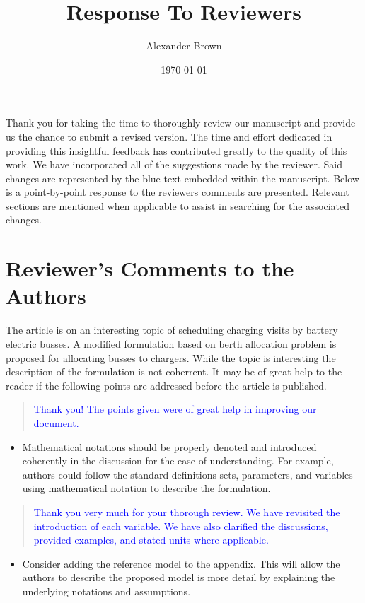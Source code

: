 \documentclass[11pt,a4paper,final]{article}
\author{Alexander Brown}
\date{\today}
\title{Response To Reviewers}
\begin{document}
\maketitle
Thank you for taking the time to thoroughly review our manuscript and provide us the chance to submit a revised version.
The time and effort dedicated in providing this insightful feedback has contributed greatly to the quality of this
work. We have incorporated all of the suggestions made by the reviewer. Said changes are represented by the blue text
embedded within the manuscript. Below is a point-by-point response to the reviewers comments are presented. Relevant
sections are mentioned when applicable to assist in searching for the associated changes.

\section{Reviewer's Comments to the Authors}
\label{sec:org262d0f1}

The article is on an interesting topic of scheduling charging visits by battery electric busses. A modified formulation
based on berth allocation problem is proposed for allocating busses to chargers. While the topic is interesting the
description of the formulation is not coherrent. It may be of great help to the reader if the following points are
addressed before the article is published.

\begin{quote}
  \textcolor{blue}{Thank you! The points given were of great help in improving our document.}
\end{quote}

\begin{itemize}
\item Mathematical notations should be properly denoted and introduced coherently in the discussion for the ease of understanding. For example, authors could follow the standard definitions sets, parameters, and variables using mathematical notation to describe the formulation.
\end{itemize}

\begin{quote}
  \textcolor{blue}{Thank you very much for your thorough review. We have revisited the introduction of each variable. We have also clarified the discussions, provided examples, and stated units where applicable.}
\end{quote}

\begin{itemize}
\item Consider adding the reference model to the appendix. This will allow the authors to describe the proposed model is more detail by explaining the underlying notations and assumptions.
\end{itemize}
\end{document}
